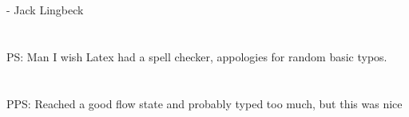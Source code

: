 \documentclass[10pt]{article}
\begin{document}
\vspace{1cm}
- Jack Lingbeck \\\\\\
\noindent
PS: Man I wish Latex had a spell checker, appologies for random basic typos.
\\\\\\
PPS: Reached a good flow state and probably typed too much, but this was nice
\end{document}
